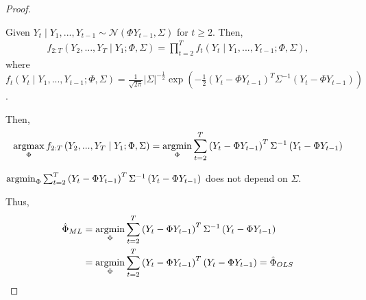 \documentclass[11pt]{elegantbook}
\newcommand{\argmax}{\operatornamewithlimits{argmax}}
\newcommand{\argmin}{\operatornamewithlimits{argmin}}
\begin{document}
\begin{proof}
    \begin{definition}
        Given $Y_t\mid Y_1,...,Y_{t-1}\sim \mathcal{N}(\Phi Y_{t-1},\Sigma)$ for $t\geq 2$. Then,
        \begin{equation}
            \begin{aligned}
                f_{2:T}\left(Y_2,...,Y_T\mid Y_1;\Phi,\Sigma\right)=\prod_{t=2}^Tf_t\left(Y_t\mid Y_1,...,Y_{t-1};\Phi,\Sigma\right),
            \end{aligned}
            \nonumber
        \end{equation}
        where $f_t\left(Y_t\mid Y_1,...,Y_{t-1};\Phi,\Sigma\right)=\frac{1}{\sqrt{2\pi}}|\Sigma|^{-\frac{1}{2}}\exp\left(-\frac{1}{2}\left(Y_t-\Phi Y_{t-1}\right)^T\Sigma^{-1}\left(Y_t-\Phi Y_{t-1}\right)\right)$.
    \end{definition}
    Then,
    \begin{equation}
        \begin{aligned}
            \argmax_{\Phi} f_{2:T}\left(Y_2,...,Y_T\mid Y_1;\Phi,\Sigma\right)=\argmin_{\Phi} \sum_{t=2}^T \left(Y_t-\Phi Y_{t-1}\right)^T\Sigma^{-1}\left(Y_t-\Phi Y_{t-1}\right)
        \end{aligned}
        \nonumber
    \end{equation}
    
    \begin{lemma}
        $\argmin_{\Phi} \sum_{t=2}^T \left(Y_t-\Phi Y_{t-1}\right)^T\Sigma^{-1}\left(Y_t-\Phi Y_{t-1}\right)$ does not depend on $\Sigma$.
    \end{lemma}
    Thus,
    \begin{equation}
        \begin{aligned}
            \hat{\Phi}_{ML}&=\argmin_{\Phi} \sum_{t=2}^T \left(Y_t-\Phi Y_{t-1}\right)^T\Sigma^{-1}\left(Y_t-\Phi Y_{t-1}\right)\\
            &=\argmin_{\Phi} \sum_{t=2}^T \left(Y_t-\Phi Y_{t-1}\right)^T\left(Y_t-\Phi Y_{t-1}\right)=\hat{\Phi}_{OLS}
        \end{aligned}
        \nonumber
    \end{equation}
\end{proof}
\end{document}
